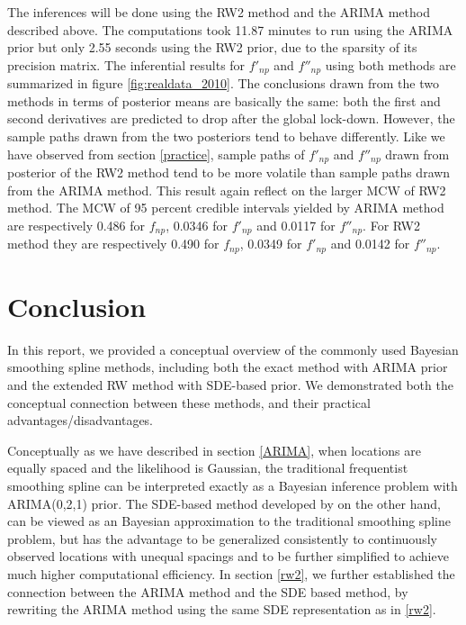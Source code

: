 \documentclass{article}
\begin{document}
The inferences will be done using the RW2 method and the ARIMA method described above. The computations took 11.87 minutes to run using the ARIMA prior but only 2.55 seconds using the RW2 prior, due to the sparsity of its precision matrix. The inferential results for $f'_{np}$ and $f''_{np}$ using both methods are summarized in figure \ref{fig:realdata_2010}. The conclusions drawn from the two methods in terms of posterior means are basically the same: both the first and second derivatives are predicted to drop after the global lock-down. However, the sample paths drawn from the two posteriors tend to behave differently. Like we have observed from section \ref{practice}, sample paths of $f'_{np}$ and $f''_{np}$ drawn from posterior of the RW2 method tend to be more volatile than sample paths drawn from the ARIMA method. This result again reflect on the larger MCW of RW2 method. The MCW of 95 percent credible intervals yielded by ARIMA method are respectively 0.486 for $f_{np}$, 0.0346 for $f'_{np}$ and 0.0117 for $f''_{np}$. For RW2 method they are respectively 0.490 for $f_{np}$, 0.0349 for $f'_{np}$ and 0.0142 for $f''_{np}$.



\section{Conclusion}\label{conclusion}

In this report, we provided a conceptual overview of the commonly used Bayesian smoothing spline methods, including both the exact method with ARIMA prior and the extended RW method with SDE-based prior. We demonstrated both the conceptual connection between these methods, and their practical advantages/disadvantages. 

Conceptually as we have described in section \ref{ARIMA}, when locations are equally spaced and the likelihood is Gaussian, the traditional frequentist smoothing spline can be interpreted exactly as a Bayesian inference problem with ARIMA(0,2,1) prior. The SDE-based method developed by \cite{rw2} on the other hand, can be viewed as an Bayesian approximation to the traditional smoothing spline problem, but has the advantage to be generalized consistently to continuously observed locations with unequal spacings and to be further simplified to achieve much higher computational efficiency. In section \ref{rw2}, we further established the connection between the ARIMA method and the SDE based method, by rewriting the ARIMA method using the same SDE representation as in \ref{rw2}.
\end{document}

